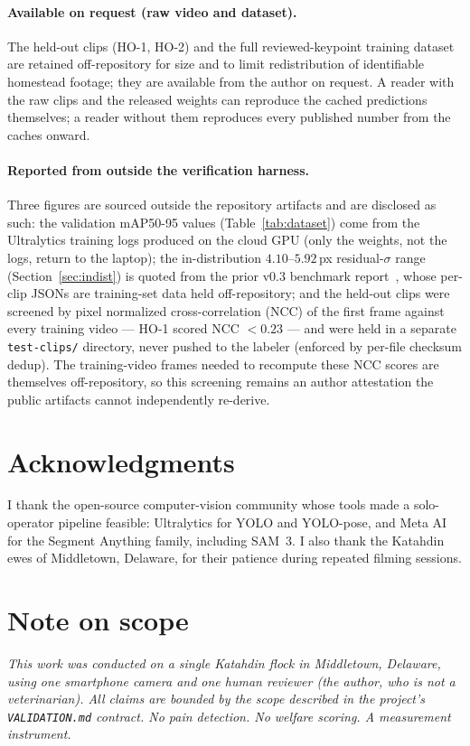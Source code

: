 \documentclass[11pt]{article}
\begin{document}
\paragraph{Available on request (raw video and dataset).} The held-out clips
(HO-1, HO-2) and the full reviewed-keypoint training dataset are retained
off-repository for size and to limit redistribution of identifiable homestead
footage; they are available from the author on request. A reader with the raw
clips and the released weights can reproduce the cached predictions themselves;
a reader without them reproduces every published number from the caches onward.

\paragraph{Reported from outside the verification harness.} Three figures are
sourced outside the repository artifacts and are disclosed as such: the validation
mAP50-95 values (Table~\ref{tab:dataset}) come from the Ultralytics training logs
produced on the cloud GPU (only the weights, not the logs, return to the laptop);
the in-distribution $4.10$--$5.92$\,px residual-$\sigma$ range
(Section~\ref{sec:indist}) is quoted from the prior v0.3 benchmark
report~\citep{v03benchmark}, whose per-clip JSONs are training-set data held
off-repository; and the held-out clips were screened by pixel normalized cross-correlation (NCC) of
the first frame against every training video --- HO-1 scored NCC ${<}0.23$ ---
and were held in a separate \texttt{test-clips/} directory, never pushed to the
labeler (enforced by per-file checksum dedup). The training-video frames needed
to recompute these NCC scores are themselves off-repository, so this screening
remains an author attestation the public artifacts cannot independently
re-derive.

\section*{Acknowledgments}
I thank the open-source computer-vision community whose tools made a
solo-operator pipeline feasible: Ultralytics for YOLO and YOLO-pose, and Meta AI
for the Segment Anything family, including SAM~3. I also thank the Katahdin ewes
of Middletown, Delaware, for their patience during repeated filming sessions.




\appendix
\section*{Note on scope}
\emph{This work was conducted on a single Katahdin flock in Middletown,
Delaware, using one smartphone camera and one human reviewer (the author, who is
not a veterinarian). All claims are bounded by the scope described in the
project's \texttt{VALIDATION.md} contract. No pain detection. No welfare scoring.
A measurement instrument.}
\end{document}
